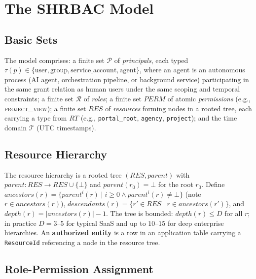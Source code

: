 \documentclass[conference]{IEEEtran}
\begin{document}
\section{The SHRBAC Model}
\label{sec:model}

\subsection{Basic Sets}

The model comprises: a finite set $\mathcal{P}$ of \emph{principals}, each typed $\tau(p) \in \{\text{user}, \text{group}, \text{service\_account}, \text{agent}\}$, where an agent is an autonomous process (AI agent, orchestration pipeline, or background service) participating in the same grant relation as human users under the same scoping and temporal constraints; a finite set $\mathcal{R}$ of \emph{roles}; a finite set $\mathit{PERM}$ of atomic \emph{permissions} (e.g., \textsc{project\_view}); a finite set $\mathit{RES}$ of \emph{resources} forming nodes in a rooted tree, each carrying a type from $\mathit{RT}$ (e.g., \texttt{portal\_root}, \texttt{agency}, \texttt{project}); and the time domain $\mathcal{T}$ (UTC timestamps).

\subsection{Resource Hierarchy}

The resource hierarchy is a rooted tree $(\mathit{RES}, \mathit{parent})$ with $\mathit{parent}: \mathit{RES} \to \mathit{RES} \cup \{\bot\}$ and $\mathit{parent}(r_0) = \bot$ for the root $r_0$. Define $\mathit{ancestors}(r) = \{\mathit{parent}^i(r) \mid i \geq 0 \wedge \mathit{parent}^i(r) \neq \bot\}$ (note $r \in \mathit{ancestors}(r)$), $\mathit{descendants}(r) = \{r' \in \mathit{RES} \mid r \in \mathit{ancestors}(r')\}$, and $\mathit{depth}(r) = |\mathit{ancestors}(r)| - 1$. The tree is bounded: $\mathit{depth}(r) \leq D$ for all $r$; in practice $D = 3$--$5$ for typical SaaS and up to $10$--$15$ for deep enterprise hierarchies. An \textbf{authorized entity} is a row in an application table carrying a \texttt{ResourceId} referencing a node in the resource tree.

\subsection{Role-Permission Assignment}
\end{document}
